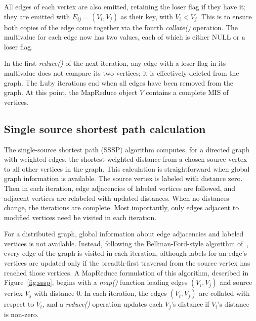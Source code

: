 All edges of each vertex are also emitted, retaining the loser flag if
they have it; they are emitted with $E_{ij} = (V_i, V_j)$ as their
key, with $V_i < V_j$.  This is to ensure both copies of the edge come
together via the fourth {\it collate()} operation.  The multivalue for
each edge now has two values, each of which is either NULL or a loser
flag.

In the first {\it reduce()} of the next iteration, any edge with a
loser flag in its multivalue does not compare its two vertices; it is
effectively deleted from the graph.  The Luby iterations end when all
edges have been removed from the graph.  At this point, the MapReduce
object $V$ contains a complete MIS of vertices.

\subsection{Single source shortest path calculation}

The single-source shortest path (SSSP) algorithm computes, for a
directed graph with weighted edges, the shortest weighted distance
from a chosen source vertex to all other vertices in the graph.  This
calculation is straightforward when global graph information is
available.  The source vertex is labeled with distance zero.  Then in
each iteration, edge adjacencies of labeled vertices are followed, and
adjacent vertices are relabeled with updated distances.  When no
distances change, the iterations are complete.  Most importantly, only
edges adjacent to modified vertices need be visited in each iteration.

For a distributed graph, global information about edge adjacencies and
labeled vertices is not available.  Instead, following the
Bellman-Ford-style algorithm of~\cite{SSSPMapReduce, Bellman58,
Ford62}, every edge of the graph is visited in each iteration,
although labels for an edge's vertices are updated only if the
breadth-first traversal from the source vertex has reached those
vertices.  A MapReduce formulation of this algorithm, described in
Figure~\ref{fig:sssp}, begins with a {\it map()} function loading
edges $(V_i, V_j)$ and source vertex $V_s$ with distance 0.  In each
iteration, the edges $(V_i, V_j)$ are collated with respect to $V_i$,
and a {\it reduce()} operation updates each $V_j$'s distance if
$V_i$'s distance is non-zero.

